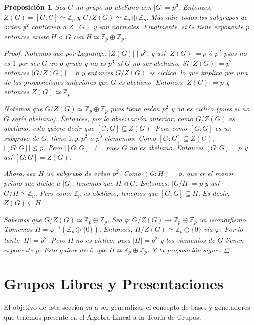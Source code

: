\documentclass[12pt]{book}
\newtheorem{prop}[teo]{Proposición}
\theoremstyle{definition}
\newcommand{\ZZ}{\mathbb{Z}}      %
\begin{document}
\begin{prop}
Sea $G$ un grupo no abeliano con $|G|=p^3$. Entonces, $Z(G)=[G:G]\simeq \ZZ_p$ y $G/Z(G) \simeq \ZZ_p\oplus \ZZ_p$. Más aún, todos los subgrupos de orden $p^2$ contienen a $Z(G)$ y son normales. Finalmente, si $G$ tiene exponente $p$ entonces existe $H\triangleleft G$ con $H\simeq \ZZ_p\oplus\ZZ_p$.
\begin{proof}
Notemos que por Lagrange, $|Z(G)|\mid p^3$, y así $|Z(G)|=p$ ó $p^2$ pues no es $1$ por ser $G$ un $p$-grupo y no es $p^3$ al $G$ no ser abeliano. Si $|Z(G)| = p^2$ entonces $|G/Z(G)|=p$ y entonces $G/Z(G)$ es cíclico, lo que implica por una de las proposiciones anteriores que $G$ es abeliano. Entonces $|Z(G)|=p$ y entonces $Z(G)\simeq \ZZ_p$.

Notemos que $G/Z(G)\simeq \ZZ_p\oplus\ZZ_p$ pues tiene orden $p^2$ y no es cíclico (pues si no $G$ sería abeliano). Entonces, por la observación anterior, como $G/Z(G)$ es abeliano, esto quiere decir que $[G:G]\subseteq Z(G)$. Pero como $[G:G]$ es un subgrupo de $G$, tiene $1,p,p^2$ o $p^3$ elementos. Como $[G:G]\subseteq Z(G)$, $|[G:G]|\leq p$. Pero $|[G:G]|\neq 1$ pues $G$ no es abeliano. Entonces $[G:G] = p$ y así $[G:G]=Z(G)$.

Ahora, sea $H$ un subgrupo de orden $p^2$. Como $(G:H)=p$, que es el menor primo que divide a $|G|$, tenemos que $H\triangleleft G$. Entonces, $|G/H|=p$ y así $G/H\simeq \ZZ_p$. Pero como $\ZZ_p$ es abeliano, tenemos que $[G:G]\subseteq H$. Es decir, $Z(G)\subseteq H$.

Sabemos que $G/Z(G)\simeq \ZZ_p\oplus\ZZ_p$. Sea $\varphi:G/Z(G)\to \ZZ_p\oplus\ZZ_p$ un isomorfismo. Tomemos $H=\varphi^{-1}(\ZZ_p\oplus \{ 0\})$. Entonces, $H/Z(G) \simeq \ZZ_p\oplus \{0\}$ vía $\varphi$. Por lo tanto $|H|=p^2$. Pero $H$ no es cíclico, pues $|H|=p^2$ y los elementos de $G$ tienen exponente $p$. Esto quiere decir que $H\simeq \ZZ_p\oplus\ZZ_p$. Y la proposición sigue.

\end{proof}
\end{prop}

\section{Grupos Libres y Presentaciones}

El objetivo de esta sección va a ser generalizar el concepto de bases y generadores que tenemos presente en el Álgebra Lineal a la Teoría de Grupos.
\end{document}
